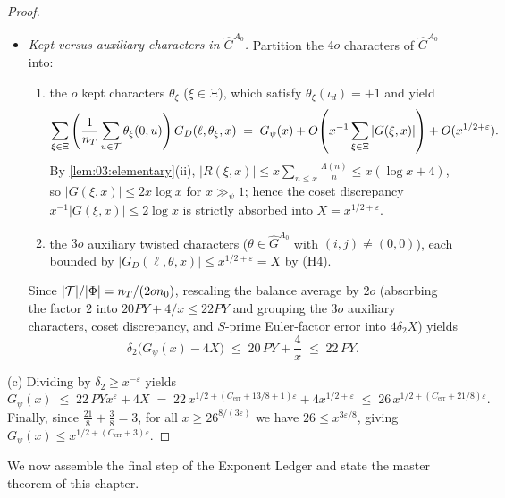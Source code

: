 \begin{proof}
\begin{itemize}
\item \emph{Kept versus auxiliary characters in $\widehat{G}^{A_0}$.} Partition the $4o$ characters of $\widehat{G}^{A_0}$ into:
  \begin{enumerate}[label=(\roman*)]
  \item the $o$ kept characters $\theta_\xi$ ($\xi \in \Xi$), which satisfy $\theta_\xi(\iota_d) = +1$ and yield
    \[
      \sum_{\xi \in \Xi} \left(\frac{1}{n_T}\sum_{u \in \mathcal{T}} \theta_\xi(0, u)\right) G_D(\ell, \theta_\xi, x)
      \;=\; G_\psi(x) + O\!\left(x^{-1}\sum_{\xi \in \Xi}|G(\xi, x)|\right) + O(x^{1/2+\varepsilon}).
    \]
    By \cref{lem:03:elementary}(ii), $|R(\xi, x)| \le x\sum_{n \le x} \frac{\Lambda(n)}{n} \le x(\log x + 4)$, so $|G(\xi, x)| \le 2x\log x$ for $x \gg_\psi 1$; hence the coset discrepancy $x^{-1}|G(\xi, x)| \le 2\log x$ is strictly absorbed into $X = x^{1/2 + \varepsilon}$.
  \item the $3o$ auxiliary twisted characters ($\theta \in \widehat{G}^{A_0}$ with $(i,j) \neq (0,0)$), each bounded by $|G_D(\ell, \theta, x)| \le x^{1/2 + \varepsilon} = X$ by (H4).
  \end{enumerate}
  Since $|\mathcal{T}| / |\Phi| = n_T / (2o n_0)$, rescaling the balance average by $2o$ (absorbing the factor $2$ into $20 P Y + 4/x \le 22 P Y$ and grouping the $3o$ auxiliary characters, coset discrepancy, and $S$-prime Euler-factor error into $4\delta_2 X$) yields
  \[
    \delta_2\bigl(G_\psi(x) - 4X\bigr) \;\le\; 20\, P Y + \frac{4}{x} \;\le\; 22\, P Y.
  \]
\end{itemize}

(c) Dividing by $\delta_2 \ge x^{-\varepsilon}$ yields
\[
  G_\psi(x) \;\le\; 22\, P Y x^{\varepsilon} + 4X
  \;=\; 22\, x^{1/2 + (C_{\mathrm{err}} + 13/8 + 1)\varepsilon} + 4x^{1/2 + \varepsilon}
  \;\le\; 26\, x^{1/2 + (C_{\mathrm{err}} + 21/8)\varepsilon}.
\]
Finally, since $\frac{21}{8} + \frac{3}{8} = 3$, for all $x \ge 26^{8/(3\varepsilon)}$ we have $26 \le x^{3\varepsilon/8}$, giving $G_\psi(x) \le x^{1/2 + (C_{\mathrm{err}} + 3)\varepsilon}$.
\end{proof}

We now assemble the final step of the Exponent Ledger and state the master theorem of this chapter.

